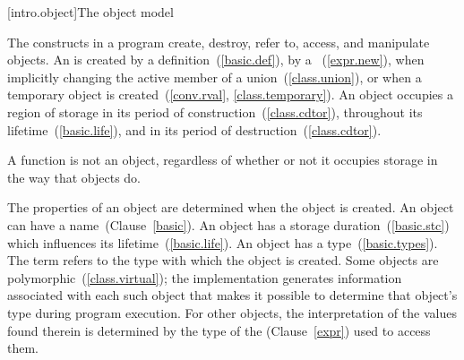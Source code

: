 [intro.object]{The \Cpp object model}

\pnum
{}%
The constructs in a \Cpp program create, destroy, refer to, access, and
manipulate objects.
An  is created
by a definition~(\ref{basic.def}),
by a ~(\ref{expr.new}),
when implicitly changing the active member of a union~(\ref{class.union}),
or
when a temporary object is created~(\ref{conv.rval}, \ref{class.temporary}). 
An object occupies a region of storage
in its period of construction~(\ref{class.cdtor}),
throughout its lifetime~(\ref{basic.life}),
and
in its period of destruction~(\ref{class.cdtor}).
\begin{note} A function is not an object, regardless of whether or not it
occupies storage in the way that objects do. \end{note}
The properties of an
object are determined when the object is created. An object can have a
name~(Clause~\ref{basic}). An object has a storage
duration~(\ref{basic.stc}) which influences its
lifetime~(\ref{basic.life}). An object has a
type~(\ref{basic.types}). The term  refers to
the type with which the object is created.
Some objects are
polymorphic~(\ref{class.virtual}); the implementation
generates information associated with each such object that makes it
possible to determine that object's type during program execution. For
other objects, the interpretation of the values found therein is
determined by the type of the  (Clause~\ref{expr})
used to access them.

